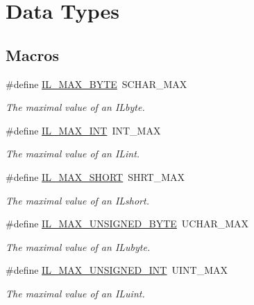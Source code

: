 \hypertarget{group__il__types}{\section{Data Types}
\label{group__il__types}
}
\subsection*{Macros}
\begin{DoxyCompactItemize}
\item 
\#define \hyperlink{group__il__types_ga4649bcaa712dfa3ac8624ea45e7d7ed8}{I\+L\+\_\+\+M\+A\+X\+\_\+\+B\+Y\+T\+E}~S\+C\+H\+A\+R\+\_\+\+M\+A\+X
\begin{DoxyCompactList}\small\item\em The maximal value of an I\+Lbyte. \end{DoxyCompactList}\item 
\#define \hyperlink{group__il__types_gadcca3decb5e180a8c2a0379cb9e7f607}{I\+L\+\_\+\+M\+A\+X\+\_\+\+I\+N\+T}~I\+N\+T\+\_\+\+M\+A\+X
\begin{DoxyCompactList}\small\item\em The maximal value of an I\+Lint. \end{DoxyCompactList}\item 
\#define \hyperlink{group__il__types_gaff68acb213b771f0915a0a7d7e1f1715}{I\+L\+\_\+\+M\+A\+X\+\_\+\+S\+H\+O\+R\+T}~S\+H\+R\+T\+\_\+\+M\+A\+X
\begin{DoxyCompactList}\small\item\em The maximal value of an I\+Lshort. \end{DoxyCompactList}\item 
\#define \hyperlink{group__il__types_gae8d904d56af734501e0bebb1ce981abb}{I\+L\+\_\+\+M\+A\+X\+\_\+\+U\+N\+S\+I\+G\+N\+E\+D\+\_\+\+B\+Y\+T\+E}~U\+C\+H\+A\+R\+\_\+\+M\+A\+X
\begin{DoxyCompactList}\small\item\em The maximal value of an I\+Lubyte. \end{DoxyCompactList}\item 
\#define \hyperlink{group__il__types_ga2c8a167d1ab04bdd7fc2dab8216d6db8}{I\+L\+\_\+\+M\+A\+X\+\_\+\+U\+N\+S\+I\+G\+N\+E\+D\+\_\+\+I\+N\+T}~U\+I\+N\+T\+\_\+\+M\+A\+X
\begin{DoxyCompactList}\small\item\em The maximal value of an I\+Luint. \end{DoxyCompactList}\item 

\end{DoxyCompactItemize}
